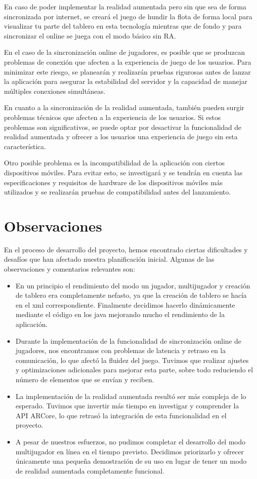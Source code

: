 \documentclass[a4paper, openright, 12pt]{article}
\begin{document}
En caso de poder implementar la realidad aumentada pero sin que sea de forma sincronizada por internet, se creará el juego de hundir la flota de forma local para visualizar tu parte del tablero en esta tecnología mientras que de fondo y para sincronizar el online se juega con el modo básico sin RA.

En el caso de la sincronización online de jugadores, es posible que se produzcan problemas de conexión que afecten a la experiencia de juego de los usuarios. Para minimizar este riesgo, se planearán y realizarán pruebas rigurosas antes de lanzar la aplicación para asegurar la estabilidad del servidor y la capacidad de manejar múltiples conexiones simultáneas.

En cuanto a la sincronización de la realidad aumentada, también pueden surgir problemas técnicos que afecten a la experiencia de los usuarios. Si estos problemas son significativos, se puede optar por desactivar la funcionalidad de realidad aumentada y ofrecer a los usuarios una experiencia de juego sin esta característica.

Otro posible problema es la incompatibilidad de la aplicación con ciertos dispositivos móviles. Para evitar esto, se investigará y se tendrán en cuenta las especificaciones y requisitos de hardware de los dispositivos móviles más utilizados y se realizarán pruebas de compatibilidad antes del lanzamiento.

\section{Observaciones}
En el proceso de desarrollo del proyecto, hemos encontrado ciertas dificultades y desafíos que han afectado nuestra planificación inicial. Algunas de las observaciones y comentarios relevantes son:

\begin{itemize}
  \item En un principio el rendimiento del modo un jugador, multijugador y creación de tablero era completamente nefasto, ya que la creación de tablero se hacía en el xml correspondiente. Finalmente decidimos hacerlo dinámicamente mediante el código en los java mejorando mucho el rendimiento de la aplicación.
  \item Durante la implementación de la funcionalidad de sincronización online de jugadores, nos encontramos con problemas de latencia y retraso en la comunicación, lo que afectó la fluidez del juego. Tuvimos que realizar ajustes y optimizaciones adicionales para mejorar esta parte, sobre todo reduciendo el número de elementos que se envían y reciben.
  \item La implementación de la realidad aumentada resultó ser más compleja de lo esperado. Tuvimos que invertir más tiempo en investigar y comprender la API ARCore, lo que retrasó la integración de esta funcionalidad en el proyecto.
  \item A pesar de nuestros esfuerzos, no pudimos completar el desarrollo del modo multijugador en línea en el tiempo previsto. Decidimos priorizarlo y ofrecer únicamente una pequeña demostración de su uso en lugar de tener un modo de realidad aumentada completamente funcional.
\end{itemize}
\end{document}
